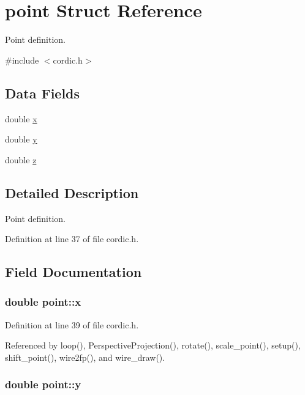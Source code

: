 \hypertarget{structpoint}{}\section{point Struct Reference}
\label{structpoint}


Point definition.  




{\ttfamily \#include $<$cordic.\+h$>$}

\subsection*{Data Fields}
\begin{DoxyCompactItemize}
\item 
double \hyperlink{structpoint_a9c6b34deaf4900ad4193c17935fd384a}{x}
\item 
double \hyperlink{structpoint_a613f8f0d7352731638b0094e1b958b87}{y}
\item 
double \hyperlink{structpoint_aab1f0c3682401083b5bf252e7001874f}{z}
\end{DoxyCompactItemize}


\subsection{Detailed Description}
Point definition. 

Definition at line 37 of file cordic.\+h.



\subsection{Field Documentation}
\subsubsection[{\texorpdfstring{x}{x}}]{\setlength{\rightskip}{0pt plus 5cm}double point\+::x}\hypertarget{structpoint_a9c6b34deaf4900ad4193c17935fd384a}{}\label{structpoint_a9c6b34deaf4900ad4193c17935fd384a}


Definition at line 39 of file cordic.\+h.



Referenced by loop(), Perspective\+Projection(), rotate(), scale\+\_\+point(), setup(), shift\+\_\+point(), wire2fp(), and wire\+\_\+draw().

\subsubsection[{\texorpdfstring{y}{y}}]{\setlength{\rightskip}{0pt plus 5cm}double point\+::y}\hypertarget{structpoint_a613f8f0d7352731638b0094e1b958b87}{}\label{structpoint_a613f8f0d7352731638b0094e1b958b87}


